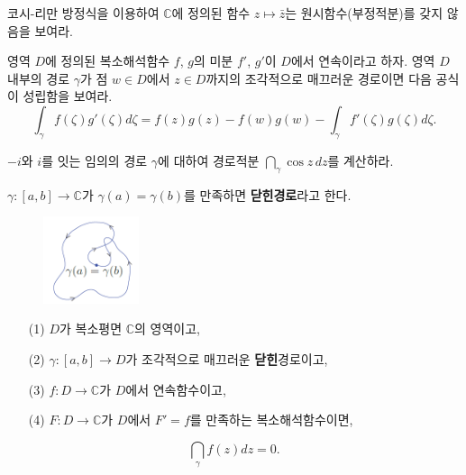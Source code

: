 \begin{salt_exercise} \label{ex-3-11}
코시-리만 방정식을 이용하여
$\mathbb C$에 정의된 함수 $z \mapsto \bar z$는 원시함수(부정적분)를 
갖지 않음을 보여라.
\end{salt_exercise}

\begin{salt_exercise}[부분적분 공식] \label{ex-3-12}
영역 $D$에 정의된 복소해석함수 $f$, $g$의 미분
$f'$, $g'$이 $D$에서 연속이라고 하자.
영역 $D$ 내부의 경로 $\gamma$가 
점 $w\in D$에서 $z\in D$까지의  조각적으로 매끄러운 경로이면
다음 공식이 성립함을 보여라.
\[
\int_\gamma f(\zeta)g'(\zeta)d\zeta 
= f(z)g(z) - f(w)g(w) - \int_\gamma f'(\zeta)g(\zeta)d\zeta.
\]
\end{salt_exercise}

\begin{salt_exercise} \label{ex-3-13}
$-i$와 $i$를 잇는 임의의 경로 $\gamma$에 대하여
경로적분 $\dint_\gamma \cos z\, dz$를 계산하라.
\end{salt_exercise}

\begin{saltdefinition}{}{} \label{def-3-2}
$\gamma:[a,b] \to \mathbb C$가
$\gamma(a)= \gamma(b)$를 만족하면 {\bf 닫힌경로}라고 한다.
\end{saltdefinition}

\begin{figure}[!h]
\begin{center}
\includegraphics[width=0.25\textwidth]{./SaltChapter/fig-3-0-1}
\end{center}
\end{figure}

\begin{salt_corollary} \label{coro-3-1}

\begin{itemize}
\item[(1)] $D$가 복소평면 $\mathbb C$의 영역이고,
\item[(2)] $\gamma : [a,b] \to D$가 조각적으로 매끄러운 {\bf 닫힌}경로이고,
\item[(3)] $f:D\to\mathbb C$가 $D$에서 연속함수이고,
\item[(4)] $F:D\to \mathbb C$가 $D$에서 $F'=f$를 만족하는 복소해석함수이면,
\end{itemize}
\[
\dint_\gamma f(z)dz = 0.
\]
\end{salt_corollary}

